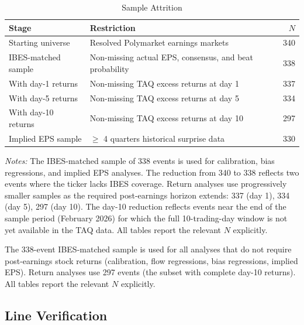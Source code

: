 \documentclass[11pt]{article}
\begin{document}
\begin{table}[htbp]
\centering
\begin{threeparttable}
\caption{Sample Attrition}
\label{tab:attrition}
\begin{tabular}{llr}
\toprule
Stage & Restriction & $N$ \\
\midrule
Starting universe & Resolved Polymarket earnings markets & 340 \\
IBES-matched sample & Non-missing actual EPS, consensus, and beat probability & 338 \\
With day-1 returns & Non-missing TAQ excess returns at day 1 & 337 \\
With day-5 returns & Non-missing TAQ excess returns at day 5 & 334 \\
With day-10 returns & Non-missing TAQ excess returns at day 10 & 297 \\
Implied EPS sample & $\geq$ 4 quarters historical surprise data & 330 \\
\bottomrule
\end{tabular}
\begin{tablenotes}
\small
\item \textit{Notes:} The IBES-matched sample of 338 events is used for calibration, bias regressions, and implied EPS analyses. The reduction from 340 to 338 reflects two events where the ticker lacks IBES coverage. Return analyses use progressively smaller samples as the required post-earnings horizon extends: 337 (day 1), 334 (day 5), 297 (day 10). The day-10 reduction reflects events near the end of the sample period (February 2026) for which the full 10-trading-day window is not yet available in the TAQ data. All tables report the relevant $N$ explicitly.
\end{tablenotes}
\end{threeparttable}
\end{table}

The 338-event IBES-matched sample is used for all analyses that do not require post-earnings stock returns (calibration, flow regressions, bias regressions, implied EPS). Return analyses use 297 events (the subset with complete day-10 returns). All tables report the relevant $N$ explicitly.

\subsection{Line Verification}
\end{document}
